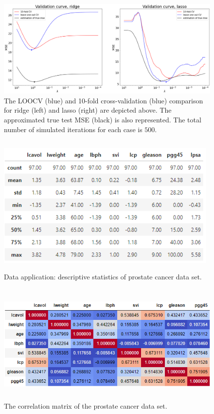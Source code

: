 \begin{figure}[H]
        \includegraphics[scale=0.35]{material/Img/CV_simulation.png}
        \centering
        \caption[LOOCV and 10-fold cross-validation comparison]{The LOOCV (blue) and 10-fold cross-validation (blue) comparison for ridge (left) and lasso (right) are depicted above. The approximated true test MSE (black) is also represented. The total number of simulated iterations for each case is $500$.}
        \label{fig:K_LOOOCV}
\end{figure}

\begin{figure}[H]
        \centering
        \includegraphics[width=11cm,height=7cm, left]{material/Img/data_descr.png}
        \caption[Data application: descriptive statistics of prostate cancer data set.]{Data application: descriptive statistics of prostate cancer data set.}
        \label{fig:descr_stats}
\end{figure}

\begin{figure}[H]
        \centering
        \includegraphics[width=12cm,height=6cm, left]{material/Img/corr_mat_data.png}
        \caption[Data application: correlation matrix]{The correlation matrix of the prostate cancer data set.}
        \label{fig:cor_matr}
\end{figure}

